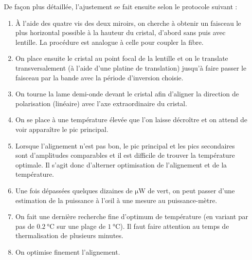 \documentclass[11pt,a4paper]{article}
\begin{document}
De façon plus détaillée, l'ajustement se fait ensuite selon le protocole suivant :
\begin{enumerate}
	\item À l'aide des quatre vis des deux miroirs, on cherche à obtenir un faisceau le plus horizontal possible à la hauteur du cristal, d'abord sans puis avec lentille. La procédure est analogue à celle pour coupler la fibre.
	\item On place ensuite le cristal au point focal de la lentille et on le translate transversalement (à l'aide d'une platine de translation) jusqu'à faire passer le faisceau par la bande avec la période d'inversion choisie.
	\item On tourne la lame demi-onde devant le cristal afin d'aligner la direction de polarisation (linéaire) avec l'axe extraordinaire du cristal.
	\item On se place à une température élevée que l'on laisse décroître et on attend de voir apparaître le pic principal.
	\item Lorsque l'alignement n'est pas bon, le pic principal et les pics secondaires sont d'amplitudes comparables et il est difficile de trouver la température optimale. Il s'agit donc d'alterner optimisation de l'alignement et de la température.
	\item Une fois dépassées quelques dizaines de $\unit{\micro\watt}$ de vert, on peut passer d'une estimation de la puissance à l'\oe il à une mesure au puissance-mètre.
	\item On fait une dernière recherche fine d'optimum de température (en variant par pas de $\SI{0.2}{\celsius}$ sur une plage de $\SI{1}{\celsius}$). Il faut faire attention au temps de thermalisation de plusieurs minutes.
	\item On optimise finement l'alignement. %
\end{enumerate}





\end{document}
